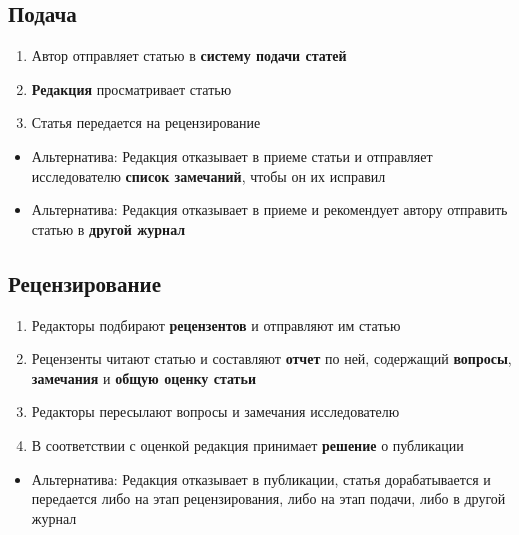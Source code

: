 \subsection{Подача}\label{ux43fux43eux434ux430ux447ux430}

\begin{enumerate}
\def\labelenumi{\arabic{enumi}.}
\tightlist
\item
  Автор отправляет статью в \textbf{систему подачи статей}
\item
  \textbf{Редакция} просматривает статью
\item
  Статья передается на рецензирование
\end{enumerate}

\begin{itemize}
\tightlist
\item
  Альтернатива: Редакция отказывает в приеме статьи и отправляет
  исследователю \textbf{список замечаний}, чтобы он их исправил
\item
  Альтернатива: Редакция отказывает в приеме и рекомендует автору
  отправить статью в \textbf{другой журнал}
\end{itemize}

\subsection{Рецензирование}\label{ux440ux435ux446ux435ux43dux437ux438ux440ux43eux432ux430ux43dux438ux435}

\begin{enumerate}
\def\labelenumi{\arabic{enumi}.}
\tightlist
\item
  Редакторы подбирают \textbf{рецензентов} и отправляют им статью
\item
  Рецензенты читают статью и составляют \textbf{отчет} по ней,
  содержащий \textbf{вопросы}, \textbf{замечания} и \textbf{общую оценку
  статьи}
\item
  Редакторы пересылают вопросы и замечания исследователю
\item
  В соответствии с оценкой редакция принимает \textbf{решение} о
  публикации
\end{enumerate}

\begin{itemize}
\tightlist
\item
  Альтернатива: Редакция отказывает в публикации, статья дорабатывается
  и передается либо на этап рецензирования, либо на этап подачи, либо в
  другой журнал
\end{itemize}

